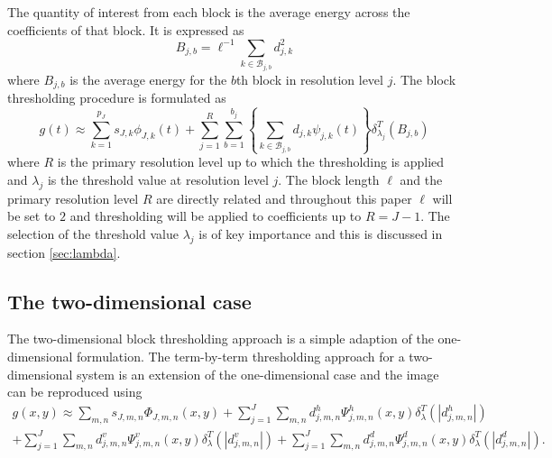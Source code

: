 \documentclass[a4paper, 12pt]{article}
\begin{document}
\medskip
The quantity of interest from each block is the average energy across the coefficients of that block. It is expressed as
\begin{equation}
B_{j,b} = \ell^{-1} \sum\limits_{k \in \mathcal{B}_{j,b}} d^{2}_{j,k}
\label{eq:blockenergy1d}
\end{equation}
where $B_{j,b}$ is the average energy for the $b$th block in resolution level $j$. The block thresholding procedure is formulated as
\begin{equation}
g(t) \approx \sum\limits^{p_{J}}_{k = 1} s_{J,k} \phi_{J,k}(t) + \sum\limits^{R}_{j = 1} \sum\limits^{b_{j}}_{b = 1} \left\{ \sum\limits_{k \in \mathcal{B}_{j,b}} d_{j,k}\psi_{j,k}(t) \right\} \delta^{T}_{\lambda_{j}} (B_{j,b})
\label{eq:block1d}
\end{equation}
where $R$ is the primary resolution level up to which the thresholding is applied and $\lambda_{j}$ is the threshold value at resolution level $j$. The block length $\ell$ and the primary resolution level $R$ are directly related and throughout this paper $\ell$ will be set to $2$ and thresholding will be applied to coefficients up to $R = J - 1$. The selection of the threshold value $\lambda_{j}$ is of key importance and this is discussed in section \ref{sec:lambda}.

\subsection{The two-dimensional case}
The two-dimensional block thresholding approach is a simple adaption of the one-dimensional formulation. The term-by-term thresholding approach for a two-dimensional system is an extension of the one-dimensional case and the image can be reproduced using
\begin{equation}
\begin{split}
g(x,y) \approx \sum\limits_{m,n} s_{J, m, n} \Phi_{J,m,n}(x,y) + \sum\limits^{J}_{j = 1} \sum\limits_{m,n} d^{h}_{j,m,n} \Psi^{h}_{j,m,n} (x,y) \delta^{T}_{\lambda}(|d^{h}_{j,m,n}|) \\
+ \sum\limits^{J}_{j = 1} \sum\limits_{m,n} d^{v}_{j,m,n} \Psi^{v}_{j,m,n} (x,y) \delta^{T}_{\lambda}(|d^{v}_{j,m,n}|) + \sum\limits^{J}_{j = 1} \sum\limits_{m,n} d^{d}_{j,m,n} \Psi^{d}_{j,m,n} (x,y) \delta^{T}_{\lambda}(|d^{d}_{j,m,n}|).
\end{split}
\label{eq:termbyterm2d}
\end{equation}
\end{document}
